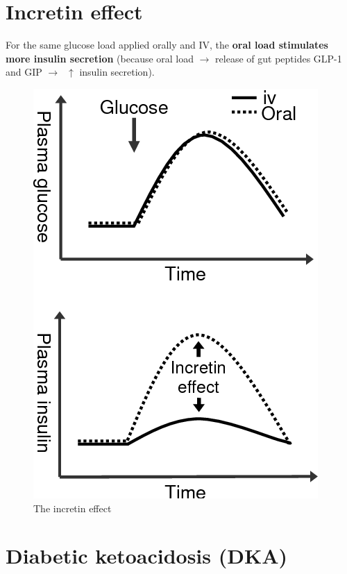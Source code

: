 \documentclass[
  12pt,
]{memoir}
\begin{document}
\hypertarget{incretin-effect}{%
\section{Incretin effect}\label{incretin-effect}}

For the same glucose load applied orally and IV, the \textbf{oral load
stimulates more insulin secretion} (because oral load \(\rightarrow\)
release of gut peptides GLP-1 and GIP \(\rightarrow\;\;\uparrow\)
insulin secretion).

\vfill

\begin{figure}[h!]
\centering
\includegraphics[width=.4\textwidth]{../assets/med/incretin.png}
\vspace{10mm}
\caption{The incretin effect}
\end{figure}

\hypertarget{diabetic-ketoacidosis-dka}{%
\section{Diabetic ketoacidosis (DKA)}\label{diabetic-ketoacidosis-dka}}
\end{document}
